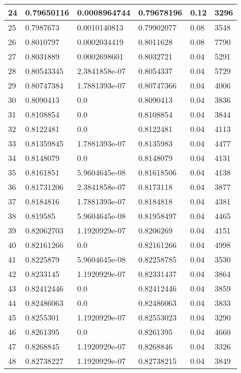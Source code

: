 \begin{longtable}{|l|l|l|l|l|l|}
24 & 0.79650116 & 0.0008964744 & 0.79678196 & 0.12 & 3296 \\ \hline 
25 & 0.7987673 & 0.0010140813 & 0.79902077 & 0.08 & 3548 \\ \hline 
26 & 0.8010797 & 0.0002034419 & 0.8011628 & 0.08 & 7790 \\ \hline 
27 & 0.8031889 & 0.0002698601 & 0.8032721 & 0.04 & 5291 \\ \hline 
28 & 0.80543345 & 2.3841858e-07 & 0.8054337 & 0.04 & 5729 \\ \hline 
29 & 0.80747384 & 1.7881393e-07 & 0.80747366 & 0.04 & 4006 \\ \hline 
30 & 0.8090413 & 0.0 & 0.8090413 & 0.04 & 3836 \\ \hline 
31 & 0.8108854 & 0.0 & 0.8108854 & 0.04 & 3844 \\ \hline 
32 & 0.8122481 & 0.0 & 0.8122481 & 0.04 & 4113 \\ \hline 
33 & 0.81359845 & 1.7881393e-07 & 0.8135983 & 0.04 & 4477 \\ \hline 
34 & 0.8148079 & 0.0 & 0.8148079 & 0.04 & 4131 \\ \hline 
35 & 0.8161851 & 5.9604645e-08 & 0.81618506 & 0.04 & 4138 \\ \hline 
36 & 0.81731206 & 2.3841858e-07 & 0.8173118 & 0.04 & 3877 \\ \hline 
37 & 0.8184816 & 1.7881393e-07 & 0.8184818 & 0.04 & 4381 \\ \hline 
38 & 0.819585 & 5.9604645e-08 & 0.81958497 & 0.04 & 4465 \\ \hline 
39 & 0.82062703 & 1.1920929e-07 & 0.8206269 & 0.04 & 4151 \\ \hline 
40 & 0.82161266 & 0.0 & 0.82161266 & 0.04 & 4998 \\ \hline 
41 & 0.8225879 & 5.9604645e-08 & 0.82258785 & 0.04 & 3530 \\ \hline 
42 & 0.8233145 & 1.1920929e-07 & 0.82331437 & 0.04 & 3864 \\ \hline 
43 & 0.82412446 & 0.0 & 0.82412446 & 0.04 & 3859 \\ \hline 
44 & 0.82486063 & 0.0 & 0.82486063 & 0.04 & 3833 \\ \hline 
45 & 0.8255301 & 1.1920929e-07 & 0.82553023 & 0.04 & 3290 \\ \hline 
46 & 0.8261395 & 0.0 & 0.8261395 & 0.04 & 4660 \\ \hline 
47 & 0.8268845 & 1.1920929e-07 & 0.8268846 & 0.04 & 3326 \\ \hline 
48 & 0.82738227 & 1.1920929e-07 & 0.82738215 & 0.04 & 3849 \\ \hline 

\end{longtable}
